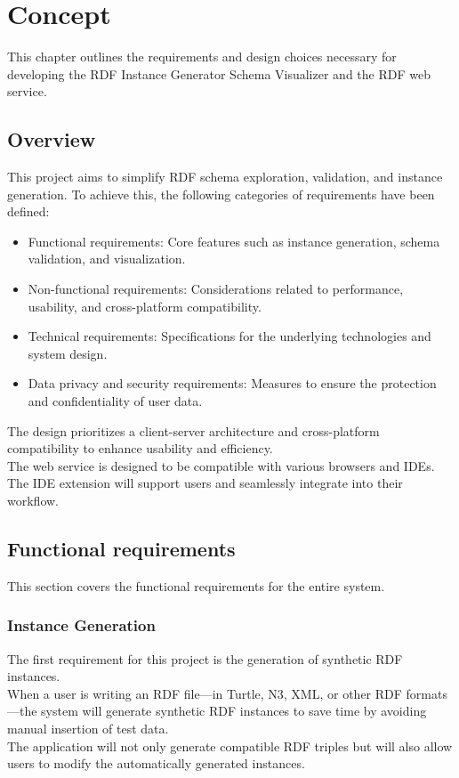 \chapter{Concept\label{cha:chapter3}}
This chapter outlines the requirements and design choices necessary for developing the RDF Instance Generator Schema Visualizer and the RDF web service.

\section{Overview\label{sec:reqoverview}}

This project aims to simplify RDF schema exploration, validation, and instance generation. To achieve this, the following categories of requirements have been defined:
\begin{itemize}
    \item Functional requirements: Core features such as instance generation, schema validation, and visualization.
    \item Non-functional requirements: Considerations related to performance, usability, and cross-platform compatibility.
    \item Technical requirements: Specifications for the underlying technologies and system design.
    \item Data privacy and security requirements: Measures to ensure the protection and confidentiality of user data.
\end{itemize}

The design prioritizes a client-server architecture and cross-platform compatibility to enhance usability and efficiency. 
\\
The web service is designed to be compatible with various browsers and IDEs. 
\\
The IDE extension will support users and seamlessly integrate into their workflow.

\section{Functional requirements\label{sec:techreq}}
This section covers the functional requirements for the entire system.

\subsection{Instance Generation\label{sec:reqsuba}}
The first requirement for this project is the generation of synthetic RDF instances.
\\
When a user is writing an RDF file—in Turtle, N3, XML, or other RDF formats—the system will generate synthetic RDF instances to save time by avoiding manual insertion of test data.
\\
The application will not only generate compatible RDF triples but will also allow users to modify the automatically generated instances.

